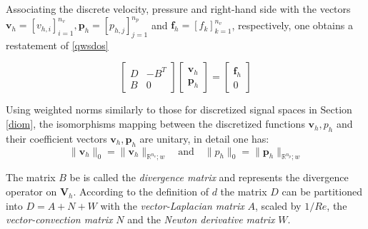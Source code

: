\documentclass[a4paper,10pt,BCOR=15mm]{scrbook}
\providecommand{\norm}[1]{\lVert#1 \rVert}
\providecommand{\andi}[0]{\quad \text{and} \quad}
\begin{document}
Associating the discrete velocity, pressure and right-hand side with the vectors $\mathbf v _h = [v_{h,i}]_{i=1}^{n_v}, \mathbf p _h = [p_{h,j}]_{j=1}^{n_p}$ and $ {\mathbf f}_h = [f_k]_{k=1}^{n_v}$, respectively, one obtains a restatement of \eqref{qwsdos} 

\begin{equation}\label{algoseen}
	 \begin{bmatrix} D& -B^T \\ B& 0 \end{bmatrix} \begin{bmatrix}{\mathbf v}_h \\ {\mathbf p}_h  \end{bmatrix} = \begin{bmatrix} {\mathbf f}_h \\ 0 \end{bmatrix} 
\end{equation}



Using weighted norms similarly to those for discretized signal spaces in Section \ref{diom}, the isomorphisms mapping between the discretized functions $\mathbf v_h,p_h$ and their coefficient vectors $\mathbf v_h,\mathbf p_h$ are unitary, in detail one has:
\begin{equation}\label{weightnormv}
 \norm{\mathbf v_h}_0 = \norm{\mathbf v_h}_{\mathbb R^{n_v};w} \andi  \norm{p_h}_0 = \norm{\mathbf p_h}_{\mathbb R^{n_p};w}
\end{equation}


The matrix $B$ be is called the \textit{divergence matrix} and represents the divergence operator on $\mathbf V_h$. According to the definition of $d$ the matrix $D$ can be partitioned into $D = A + N + W$ with the \textit{vector-Laplacian matrix} $A$, scaled by $1/Re$, the \textit{vector-convection matrix} $N$ and the \textit{Newton derivative matrix} $W$.
\end{document}
